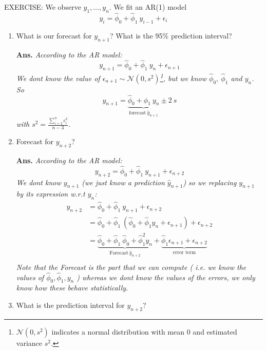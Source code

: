 \documentclass[a4paper,11pt,oneside,onecolumn]{book}
\begin{document}
\noindent EXERCISE: We observe $y_1,\ldots,y_n$. We fit an AR(1) model 
$$
y_i = \hat{\phi}_0 + \hat{\phi}_1 \ y_{i-1} +\epsilon_i
$$
\begin{enumerate}
\item   What is our forecast for $y_{n+1}$? What is
the 95\% prediction interval?

\vspace{.5cm}
\textbf{Ans.}
\textit{According to the AR model:
$$
y_{n+1}= \hat{\phi}_0 + \hat{\phi}_1 \ y_{n} +\epsilon_{n+1}
$$
We dont know the value of $\epsilon_{n+1}\sim\mathcal{N}(0,s^2)$\footnote{$\mathcal{N}(0,s^2)$ indicates a normal distribution with mean 0 and estimated variance $s^2$.}, but we know $\hat{\phi}_0,\ \hat{\phi}_1 $ and $y_{n}$. So
$$ 
y_{n+1}= \underbrace{\hat{\phi}_0 + \hat{\phi}_1 \ y_{n}}_{\text{forecast}\ \hat{y}_{n+1}} \pm 2\ s
$$
with $s^2= \frac{\sum_{i=2}^{n}\epsilon_i^2}{n-3}$.
}

\vspace{.5cm}
\item  Forecast for $y_{n+2}$?

\vspace{.5cm}

\textbf{Ans.}
\textit{According to the AR model:
$$
y_{n+2}= \hat{\phi}_0 + \hat{\phi}_1 \ y_{n+1} +\epsilon_{n+2}
$$
We dont know $y_{n+1}$ (we just know a prediction $\hat{y}_{n+1}$) so we  replacing $y_{n+1}$ by its expression w.r.t $y_n$:
$$
\begin{array}{ll}
y_{n+2}&= \hat{\phi}_0 + \hat{\phi}_1 \ y_{n+1} +\epsilon_{n+2}\\
& = \hat{\phi}_0 + \hat{\phi}_1 \ (\hat{\phi}_0 + \hat{\phi}_1  y_{n} +\epsilon_{n+1}) +\epsilon_{n+2}\\
& = \underbrace{\hat{\phi}_0 + \hat{\phi}_1 \ \hat{\phi}_0 + \hat{\phi}_1^2  y_{n}}_{\text{Forecast}\ \hat{y}_{n+2}} + \underbrace{\hat{\phi}_1 \epsilon_{n+1} +\epsilon_{n+2}}_{\text{error term}}\\
\end{array}
$$
Note that the Forecast is the part that we can compute ( i.e. we know the values of $\hat{\phi}_0,\hat{\phi}_1, y_n$ ) whereas we dont know the values of the errors, we only know how these behave statistically.
}
\vspace{.5cm}

\item What is the prediction interval for $y_{n+2}$? 

\vspace{.5cm}


\end{enumerate}
\end{document}
